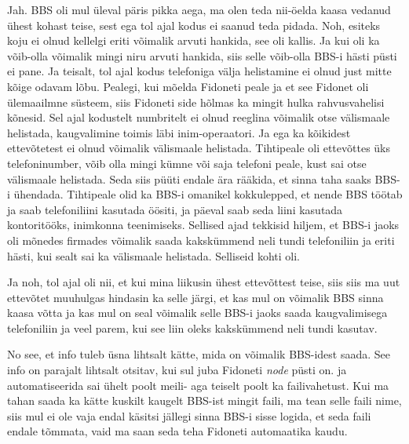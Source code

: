 Jah. BBS  oli mul üleval päris pikka aega, ma olen teda nii-öelda kaasa vedanud 
 ühest kohast teise, sest ega tol ajal kodus ei saanud teda pidada. Noh, 
esiteks koju ei olnud kellelgi eriti võimalik arvuti hankida, see oli kallis. 
Ja kui oli ka võib-olla võimalik mingi niru arvuti hankida, siis selle  
võib-olla BBS-i hästi püsti ei pane. Ja teisalt, tol ajal kodus telefoniga 
välja helistamine ei olnud just mitte kõige odavam lõbu. Pealegi, kui mõelda 
Fidoneti peale ja et see Fidonet  oli ülemaailmne süsteem, siis Fidoneti side 
hõlmas ka mingit hulka rahvusvahelisi kõnesid. Sel ajal kodustelt numbritelt ei 
olnud reeglina võimalik otse  välismaale helistada, kaugvalimine toimis läbi 
inim-operaatori. Ja ega ka kõikidest ettevõtetest  ei olnud võimalik välismaale 
helistada. Tihtipeale oli ettevõttes üks telefoninumber, võib olla mingi kümne 
või saja telefoni peale, kust sai otse välismaale helistada. Seda siis püüti 
endale ära rääkida, et sinna taha saaks BBS-i ühendada. Tihtipeale olid ka 
BBS-i omanikel kokkulepped, et nende BBS töötab ja saab telefoniliini kasutada 
öösiti, ja päeval saab seda liini kasutada kontoritööks, inimkonna teenimiseks. 
Sellised ajad tekkisid hiljem, et BBS-i jaoks oli mõnedes firmades võimalik 
saada kakskümmend neli tundi telefoniliin ja eriti hästi, kui sealt sai ka 
välismaale helistada. Selliseid kohti oli. 

Ja noh, tol ajal oli nii, et kui mina liikusin ühest ettevõttest teise, siis 
siis ma uut ettevõtet muuhulgas hindasin ka selle järgi, et kas mul on võimalik 
BBS sinna kaasa võtta ja kas mul on seal võimalik selle BBS-i jaoks saada  
kaugvalimisega telefoniliin ja veel parem, kui see liin oleks  kakskümmend neli 
tundi kasutav.


No see, et info tuleb üsna lihtsalt kätte, mida on võimalik BBS-idest saada. 
See info on parajalt lihtsalt otsitav, kui sul juba Fidoneti \emph{node} püsti 
on. ja automatiseerida sai ühelt poolt meili-  aga teiselt poolt ka 
failivahetust. Kui ma tahan saada ka kätte kuskilt kaugelt BBS-ist mingit 
faili, ma tean selle faili nime, siis mul ei ole vaja endal käsitsi jällegi 
sinna BBS-i sisse logida, et seda faili endale tõmmata, vaid ma saan seda teha 
Fidoneti automaatika kaudu.

